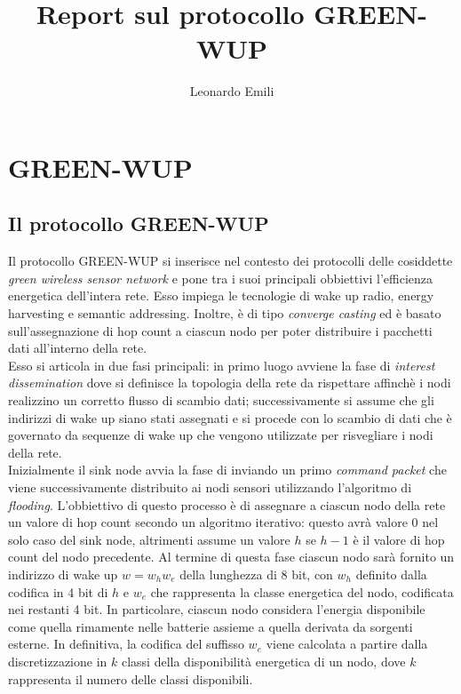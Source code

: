 \documentclass{report}
\title{Report sul protocollo GREEN-WUP}
\author{Leonardo Emili}
\begin{document}
\maketitle
\tableofcontents

\chapter{GREEN-WUP}
\section{Il protocollo GREEN-WUP}

Il protocollo GREEN-WUP si inserisce nel contesto dei protocolli delle cosiddette \emph{green wireless sensor network} e pone tra i suoi principali
obbiettivi l'efficienza energetica dell'intera rete. Esso impiega le tecnologie di wake up radio, energy harvesting e semantic addressing. Inoltre, è 
di tipo \emph{converge casting} ed è basato sull'assegnazione di hop count a ciascun nodo per poter distribuire i pacchetti dati
all'interno della rete.\\

Esso si articola in due fasi principali: in primo luogo avviene la fase di \emph{interest dissemination} dove si definisce la
topologia della rete da rispettare affinchè i nodi realizzino un corretto flusso di scambio dati; successivamente si assume che gli indirizzi di
wake up siano stati assegnati e si procede con lo scambio di dati che è governato da sequenze di wake up che vengono utilizzate per
risvegliare i nodi della rete.\\

Inizialmente il sink node avvia la fase di  inviando
un primo \emph{command packet} che viene successivamente distribuito ai nodi sensori utilizzando l'algoritmo di \emph{flooding}.
L'obbiettivo di questo processo è di assegnare a ciascun nodo della rete un valore di hop count secondo un algoritmo iterativo: questo
avrà valore 0 nel solo caso del sink node, altrimenti assume un valore $h$ se $h-1$ è il valore di hop count del nodo precedente. Al termine
di questa fase ciascun nodo sarà fornito un indirizzo di wake up $w=w_{h}w_{e}$ della lunghezza di 8 bit, con $w_{h}$ definito dalla
codifica in 4 bit di $h$ e $w_{e}$ che rappresenta la classe energetica del nodo, codificata nei restanti 4 bit. In particolare, ciascun nodo considera
l'energia disponibile come quella rimamente nelle batterie assieme a quella derivata da sorgenti esterne. In definitiva, la codifica del suffisso $w_{e}$
viene calcolata a partire dalla discretizzazione in $k$ classi della disponibilità energetica di un nodo, dove $k$ rappresenta il numero delle classi
disponibili.\\
\end{document}
